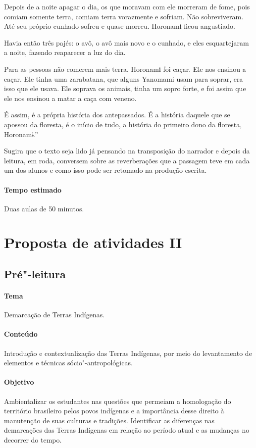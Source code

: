 \documentclass[12pt]{extarticle}
\begin{document}
{Depois de a noite apagar o dia, os que moravam com ele morreram de fome, pois comiam somente terra,
comiam terra vorazmente e sofriam. Não sobreviveram. Até seu próprio cunhado sofreu e quase morreu. 
Horonamɨ ficou angustiado.

Havia então três pajés: o avô, o avô mais novo e o cunhado, e eles esquartejaram a noite, fazendo 
reaparecer a luz do dia.

Para as pessoas não comerem mais terra, Horonamɨ foi caçar. Ele nos ensinou a caçar. Ele tinha uma 
zarabatana, que alguns Yanomami usam para soprar, era isso que ele usava. Ele soprava os animais, tinha 
um sopro forte, e foi assim que ele nos ensinou a matar a caça com veneno.

É assim, é a própria história dos antepassados. É a história daquele que se apossou da floresta, é o 
início de tudo, a história do primeiro dono da floresta, Horonamɨ.''

Sugira que o texto seja lido já pensando na transposição do narrador e depois da leitura, em roda,
conversem sobre as reverberações que a passagem teve em cada um dos alunos e como isso pode ser
retomado na produção escrita.

\paragraph{Tempo estimado} Duas aulas de 50 minutos.


\section{Proposta de atividades II}

\subsection{Pré"-leitura}

\paragraph{Tema} Demarcação de Terras Indígenas.

\paragraph{Conteúdo} Introdução e contextualização das Terras Indígenas, por meio
do levantamento de elementos e técnicas sócio"-antropológicas.

\paragraph{Objetivo} Ambientalizar os estudantes nas questões que permeiam a homologação
do território brasileiro pelos povos indígenas e a importância desse direito à manutenção
de suas culturas e tradições.
Identificar as diferenças nas demarcações das Terras Indígenas em relação ao período
atual e as mudanças no decorrer do tempo.

}
\end{document}
